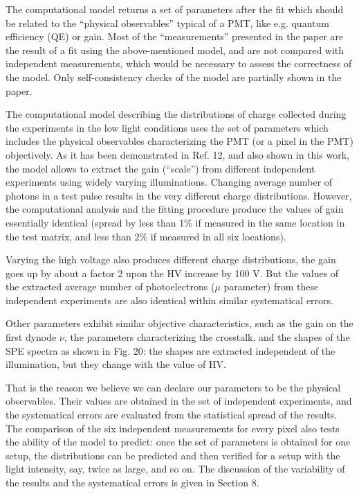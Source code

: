 \documentclass[11pt]{report}
\begin{document}
\newpage
\begin{tcolorbox}[enlarge top by=2em,colbacktitle=black!60!white,colframe=black!80!white,left=0pt,right=0pt,top=0pt,bottom=0pt,boxrule=0.3pt,title=\bfseries2.09]
The computational model returns a set of parameters after the fit which should be related to the ``physical observables'' typical of a PMT, like e.g. quantum efficiency (QE) or gain. Most of the ``measurements'' presented in the paper are the result of a fit using the above-mentioned model, and are not compared with independent measurements, which would be necessary to assess the correctness of the model. Only self-consistency checks of the model are partially shown in the paper. 
\end{tcolorbox}




The computational model describing the distributions of charge collected during the experiments in the low light conditions uses the set of parameters which includes the physical observables characterizing the PMT (or a pixel in the PMT) objectively. As it has been demonstrated in Ref. 12, and also shown in this work, the model allows to extract the gain (``scale'') from different independent experiments using widely varying illuminations. Changing average number of photons in a test pulse results in the very different charge distributions. However, the computational analysis and the fitting procedure produce the values of gain essentially identical (spread by less than 1\% if measured in the same location in the test matrix, and less than 2\% if measured in all six locations). 


Varying the high voltage also produces different charge distributions, the gain goes up by about a factor 2 upon the HV increase by 100 V. But the values of the extracted average number of photoelectrons ($\mu$ parameter) from these independent experiments are also identical within similar systematical errors. 

Other parameters exhibit similar objective characteristics, such as the gain on the first dynode $\nu$, the parameters characterizing the crosstalk, and the shapes of the SPE spectra as shown in Fig. 20: the shapes are extracted independent of the illumination, but they change with the value of HV.

That is the reason we believe we can declare our parameters to be the physical observables. Their values are obtained in the set of independent experiments, and the systematical errors are evaluated from the statistical spread of the results. The comparison of the six independent measurements for every pixel also tests the ability of the model to predict: once the set of parameters is obtained for one setup, the distributions can be predicted and then verified for a setup with the light intensity, say, twice as large, and so on. The discussion of the variability of the results and the systematical errors is given in Section 8.
\end{document}
